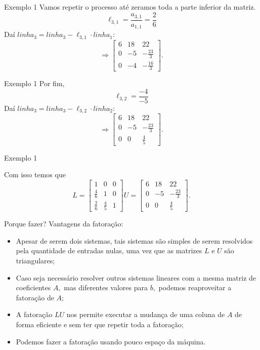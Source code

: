 \documentclass[]{beamer}
\begin{document}
\begin{frame}{Exemplo 1}
Vamos repetir o processo até zeramos toda a parte inferior da matriz.
$$\ell_{3,1} = \dfrac{a_{3,1}}{a_{1,1}} = \dfrac{2}{6}$$
Daí $linha_3 = linha_3 - \ell_{3,1} \cdot linha_1: $
$$\Rightarrow \begin{bmatrix}6&18&22\\ 0&-5&-\frac{23}{3}\\ 0&-4&-\frac{16}{3}\end{bmatrix}.$$
\end{frame}

\begin{frame}{Exemplo 1}
Por fim, $$\ell_{3,2}  = \dfrac{-4}{-5}$$
Daí $linha_3 = linha_3 - \ell_{3,2} \cdot linha_2: $
$$\Rightarrow \begin{bmatrix}6&18&22\\ 0&-5&-\frac{23}{3}\\ 0&0&\frac{4}{5}\end{bmatrix}.$$
\end{frame}

\begin{frame}{Exemplo 1}

Com isso temos que $$L=\begin{bmatrix}1&0&0\\ \frac{4}{6}&1&0\\ \frac{2}{6}&\frac{4}{5}&1\end{bmatrix} U = \begin{bmatrix}6&18&22\\ 0&-5&-\frac{23}{3}\\ 0&0&\frac{4}{5}\end{bmatrix}.$$ 
\end{frame}

\begin{frame}{Porque fazer?}
Vantagens da fatoração:
\begin{itemize}
	\item Apesar de serem dois sistemas, tais sistemas são simples de serem resolvidos pela quantidade de entradas nulas, uma vez que as matrizes $L$ e $U$ são triangulares;
	
	\item  Caso seja necessário resolver outros sistemas lineares com a mesma matriz de coeficientes $A,$ mas diferentes valores para $b,$ podemos reaproveitar a fatoração de $A;$
	
	\item A fatoração $LU$ nos permite executar a mudança de uma coluna de $A$ de forma eficiente e sem ter que repetir toda a fatoração;
	
	\item Podemos fazer a fatoração usando pouco espaço da máquina.
\end{itemize}

\end{frame}
\end{document}
